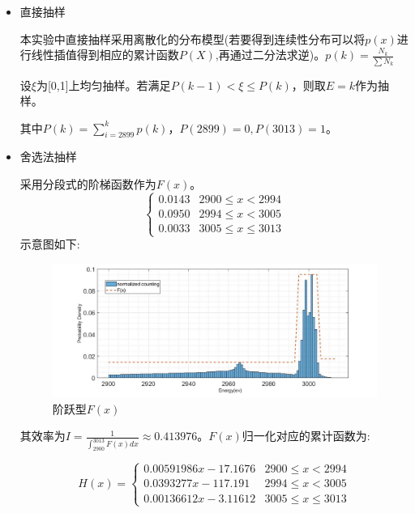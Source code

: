 \documentclass[UTF8]{ctexart}
\begin{document}
	\begin{itemize}
		\item 直接抽样
		
		本实验中直接抽样采用离散化的分布模型(若要得到连续性分布可以将$p(x)$进行线性插值得到相应的累计函数$P(X)$,再通过二分法求逆)。$p(k)=\frac{N_k}{\sum N_k}$
		
		设$\xi$为[0,1]上均匀抽样。若满足$P(k-1)<\xi\leq P(k)$，则取$E=k$作为抽样。
		
		其中$P(k)=\sum_{i=2899}^{k}p(k)$，$P(2899)=0,P(3013)=1$。
		\item 舍选法抽样
		
		采用分段式的阶梯函数作为$F(x)$。
		$$\left\{
		\begin{array}{lc}
			0.0143& 2900\leq x<2994\\
			0.0950& 2994\leq x < 3005\\
			0.0033& 3005\leq x\leq 3013
		\end{array}
		\right.$$
		示意图如下:
		\begin{figure}[H]
			\centering\includegraphics[width=6in]{../figure/curve2}
			\caption{阶跃型$F(x)$}
		\end{figure}
	
	其效率为$I=\frac{1}{\int_{2900}^{3013}F(x)dx}\approx0.413976$。$F(x)$归一化对应的累计函数为:
	
	$$H(x)=\left\{
	\begin{array}{lc}
	0.00591986x-17.1676& 2900\leq x<2994\\
	 0.0393277 x-117.191 & 2994\leq x < 3005\\
    0.00136612 x-3.11612 & 3005\leq x\leq 3013
	\end{array}
	\right.$$
	

\end{itemize}
\end{document}
